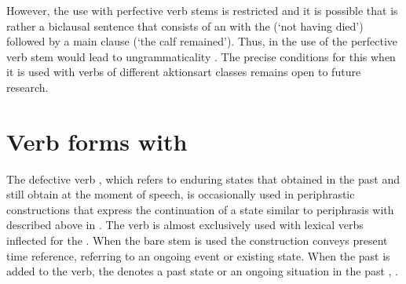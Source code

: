 However, the use with perfective verb stems is restricted and it is possible that  is rather a biclausal sentence that consists of an  with the  (`not having died') followed by a main clause (`the calf remained'). Thus, in  the use of the perfective verb stem would lead to ungrammaticality . The precise conditions for this  when it is used with verbs of different aktionsart classes  remains open to future research.

\begin{exe}
\end{exe}





\section{Verb forms with \protect{} \protect{}}
\label{sec:Verb forms with b-el remain, stay}

The defective verb  , which refers to enduring states that obtained in the past and still obtain at the moment of speech, is occasionally used in periphrastic constructions that express the continuation of a state similar to periphrasis with  described above in . The verb  is almost exclusively used with lexical verbs inflected for the . When the bare stem  is used the construction conveys present time reference, referring to an ongoing event  or existing state. When the past  is added to the verb, the  denotes a past state or an ongoing situation in the past , .

